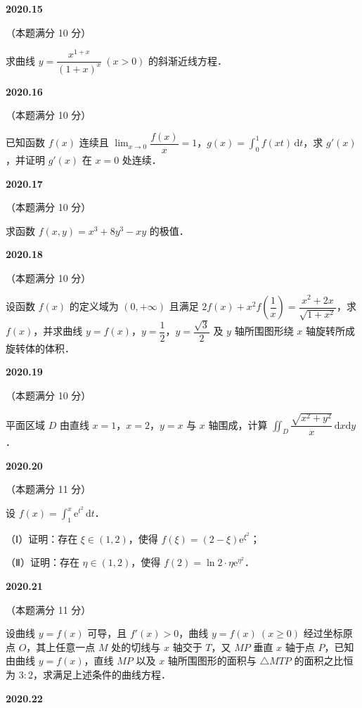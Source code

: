 \documentclass[UTF8,12pt,fontset=windows]{ctexart}
\begin{document}
\vfill
\newpage
{\large\bfseries 2020.15}

（本题满分 10 分）

求曲线 $y = \dfrac{x^{1+x}}{(1+x)^x}\ (x > 0)$ 的斜渐近线方程．

\vfill
\newpage
{\large\bfseries 2020.16}

（本题满分 10 分）

已知函数 $f(x)$ 连续且 $\lim_{x\to 0} \dfrac{f(x)}{x} = 1$，$g(x) = \displaystyle\int_{0}^{1} f(xt)\,\mathrm{d}t$，求 $g'(x)$，并证明 $g'(x)$ 在 $x = 0$ 处连续．

\vfill
\newpage
{\large\bfseries 2020.17}

（本题满分 10 分）

求函数 $f(x,y) = x^3 + 8y^3 - xy$ 的极值．

\vfill
\newpage
{\large\bfseries 2020.18}

（本题满分 10 分）

设函数 $f(x)$ 的定义域为 $(0, +\infty)$ 且满足 $2f(x) + x^2 f\left(\dfrac{1}{x}\right) = \dfrac{x^2 + 2x}{\sqrt{1+x^2}}$，求 $f(x)$，并求曲线 $y = f(x)$，$y = \dfrac{1}{2}$，$y = \dfrac{\sqrt{3}}{2}$ 及 $y$ 轴所围图形绕 $x$ 轴旋转所成旋转体的体积．

\vfill
\newpage
{\large\bfseries 2020.19}

（本题满分 10 分）

平面区域 $D$ 由直线 $x = 1$，$x = 2$，$y = x$ 与 $x$ 轴围成，计算 $\displaystyle\iint_D \dfrac{\sqrt{x^2+y^2}}{x}\,\mathrm{d}x\mathrm{d}y$．

\vfill
\newpage
{\large\bfseries 2020.20}

（本题满分 11 分）

设 $f(x) = \displaystyle\int_{1}^{x} \mathrm{e}^{t^2}\,\mathrm{d}t$．

（Ⅰ）证明：存在 $\xi \in (1,2)$，使得 $f(\xi) = (2-\xi)\mathrm{e}^{\xi^2}$；

（Ⅱ）证明：存在 $\eta \in (1,2)$，使得 $f(2) = \ln 2 \cdot \eta\mathrm{e}^{\eta^2}$．

\vfill
\newpage
{\large\bfseries 2020.21}

（本题满分 11 分）

设曲线 $y = f(x)$ 可导，且 $f'(x) > 0$，曲线 $y = f(x)\ (x \geqslant 0)$ 经过坐标原点 $O$，其上任意一点 $M$ 处的切线与 $x$ 轴交于 $T$，又 $MP$ 垂直 $x$ 轴于点 $P$，已知由曲线 $y = f(x)$，直线 $MP$ 以及 $x$ 轴所围图形的面积与 $\triangle MTP$ 的面积之比恒为 $3:2$，求满足上述条件的曲线方程．

\vfill
\newpage
{\large\bfseries 2020.22}
\end{document}
